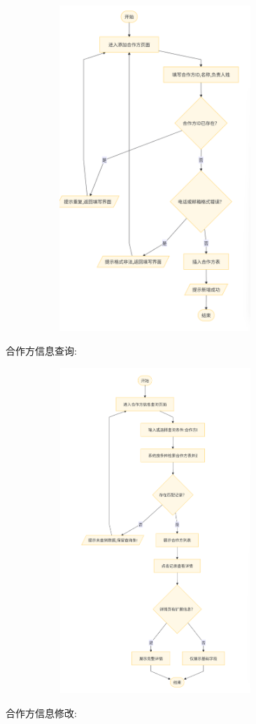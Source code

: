 \documentclass[]{article}
\begin{document}
\includegraphics[width=4.45694in,height=4.83819in]{media/media/image_2-4-1.png}

合作方信息查询:

\includegraphics[width=4.45694in,height=4.83819in]{media/media/image_2-4-2.png}

合作方信息修改:
\end{document}
